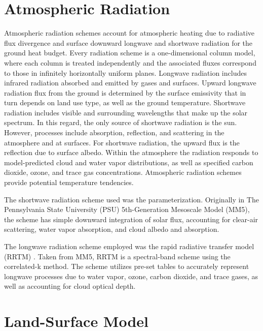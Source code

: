 \section{Atmospheric Radiation}
\label{ar-33}

Atmospheric radiation schemes account for atmospheric heating due to radiative flux divergence and surface downward longwave and shortwave radiation for the ground heat budget. Every radiation scheme is a one-dimensional column model, where each column is treated independently and the associated fluxes correspond to those in infinitely horizontally uniform planes. Longwave radiation includes infrared radiation absorbed and emitted by gases and surfaces. Upward longwave radiation flux from the ground is determined by the surface emissivity that in turn depends on land use type, as well as the ground temperature. Shortwave radiation includes visible and surrounding wavelengths that make up the solar spectrum. In this regard, the only source of shortwave radiation is the sun. However, processes include absorption, reflection, and scattering in the atmosphere and at surfaces. For shortwave radiation, the upward flux is the reflection due to surface albedo. Within the atmosphere the radiation responds to model-predicted cloud and water vapor distributions, as well as specified carbon dioxide, ozone, and trace gas concentrations. Atmospheric radiation schemes provide potential temperature tendencies.

The shortwave radiation scheme used was the  \citet{Dud89} parameterization. Originally in The Pennsylvania State University (PSU) 5th-Generation Mesoscale Model (MM5), the scheme has simple downward integration of solar flux, accounting for clear-air scattering, water vapor absorption, and cloud albedo and absorption.

The longwave radiation scheme employed was the rapid radiative transfer model (RRTM)  \citet{Mlawer97}. Taken from MM5, RRTM is a spectral-band scheme using the correlated-k method. The scheme utilizes pre-set tables to accurately represent longwave processes due to water vapor, ozone, carbon dioxide, and trace gases, as well as accounting for cloud optical depth.

\section{Land-Surface Model}
\label{lsm-34}

